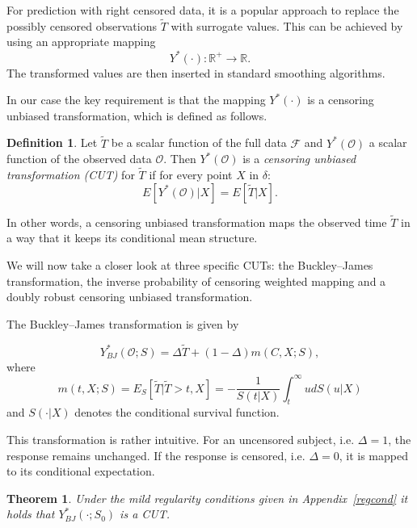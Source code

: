 \documentclass[12pt, a4paper]{scrartcl}
\theoremstyle{definition}
\newtheorem{Definition}{Definition}[section]
\theoremstyle{plain}
\newtheorem{Theorem}{Theorem}[section]
\numberwithin{equation}{section}
\numberwithin{figure}{section}
\numberwithin{table}{section}
\begin{document}
	For prediction with right censored data, it is a popular approach to replace the possibly censored observations $\tilde T$ with surrogate values.
	This can be achieved by using an appropriate mapping $$Y^*(\cdot): \mathbb{R}^+ \to \mathbb{R}.$$
	The transformed values are then inserted in standard smoothing algorithms.
	
	In our case the key requirement is that the mapping $Y^*(\cdot)$ is a censoring unbiased transformation, which is defined as follows.
	
	\begin{Definition}
	Let $\tilde T$ be a scalar function of the full data $\mathcal{F}$ and $Y^*(\mathcal{O})$ a scalar function of the observed data $\mathcal{O}$.
	Then $Y^*(\mathcal{O})$ is a \textit{censoring unbiased transformation (CUT)} for $\tilde T$ if for every point $X$ in $\delta$:
	\begin{equation*}
	E[Y^*(\mathcal{O}) \vert X] = E[\tilde T \vert X].
	\end{equation*}
	\end{Definition}

	In other words, a censoring unbiased transformation maps the observed time $\tilde T$ in a way that it keeps its conditional mean structure.
	
	We will now take a closer look at three specific CUTs: the Buckley--James transformation, the inverse probability of censoring weighted mapping and a doubly robust censoring unbiased transformation.
	
	The Buckley--James transformation is given by
	
	\begin{equation}\label{eq:bjtrafo}
		Y_{BJ}^* (\mathcal{O}; S) = \Delta \tilde{T} + (1-\Delta)m(C,X;S),
	\end{equation}
	where
	\begin{equation}\label{eq:condmean}
		m(t,X;S) = E_S[\tilde{T} \vert \tilde T > t, X] = -\frac{1}{S(t\vert X)} \int_t^{\infty} u dS(u\vert X)
	\end{equation}%
	and $S(\cdot\vert X)$ denotes the conditional survival function.
	
	
	This transformation is rather intuitive.
	For an uncensored subject, i.e. $\Delta = 1$, the response remains unchanged.
	If the response is censored, i.e. $\Delta = 0$, it is mapped to its conditional expectation. %
	
	\begin{Theorem}\label{thm:bj}
		Under the mild regularity conditions given in Appendix~\ref{regcond} it holds that $Y_{BJ}^*(\cdot; S_0)$ is a CUT.
	\end{Theorem}
	
\end{document}
